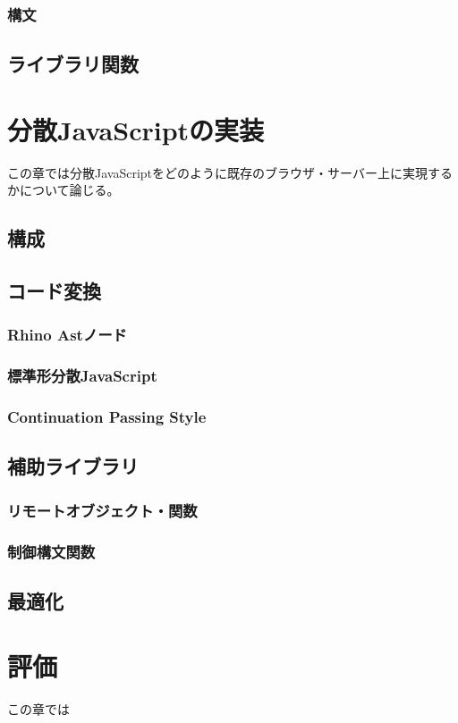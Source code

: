 \documentclass[a4j,12pt]{jreport}
\begin{document}
\subsection{構文}
\section{ライブラリ関数}

\chapter{分散JavaScriptの実装}
この章では分散JavaScriptをどのように既存のブラウザ・サーバー上に実現するかについて論じる。
\section{構成}
\section{コード変換}
\subsection{Rhino Astノード}
\subsection{標準形分散JavaScript}
\subsection{Continuation Passing Style}
\section{補助ライブラリ}
\subsection{リモートオブジェクト・関数}
\subsection{制御構文関数}
\section{最適化}
 
\chapter{評価}
この章では
\end{document}
